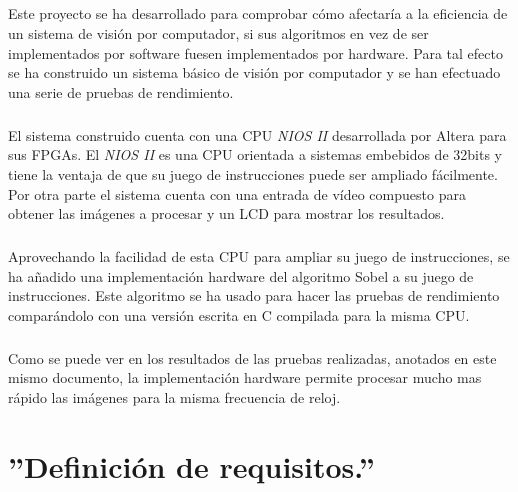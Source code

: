 \documentclass[a4paper,12pt,titlepage,final]{book}
\begin{document}
\paragraph{}
Este proyecto se ha desarrollado para comprobar cómo afectaría a la eficiencia de un sistema de visión por computador, si sus algoritmos en vez de ser implementados por software fuesen implementados por hardware. Para tal efecto se ha construido un sistema básico de visión por computador y se han efectuado una serie de pruebas de rendimiento.

\paragraph{}
El sistema construido cuenta con una CPU \textit{NIOS II} desarrollada por Altera para sus FPGAs. El \textit{NIOS II} es una CPU orientada a sistemas embebidos de 32bits y tiene la ventaja de que su juego de instrucciones puede ser ampliado fácilmente. Por otra parte el sistema cuenta con una entrada de vídeo compuesto para obtener las imágenes a procesar y un LCD para mostrar los resultados.

\paragraph{}
Aprovechando la facilidad de esta CPU para ampliar su juego de instrucciones, se ha añadido una implementación hardware del algoritmo Sobel a su juego de instrucciones. Este algoritmo se ha usado para hacer las pruebas de rendimiento comparándolo con una versión escrita en C compilada para la misma CPU.

\paragraph{}
Como se puede ver en los resultados de las pruebas realizadas, anotados en este mismo documento, la implementación hardware permite procesar mucho mas rápido las imágenes para la misma frecuencia de reloj.

\chapter{''Definición de requisitos.''} \label{chap:defreq}

\section*{}
\subsection*{}
\end{document}
